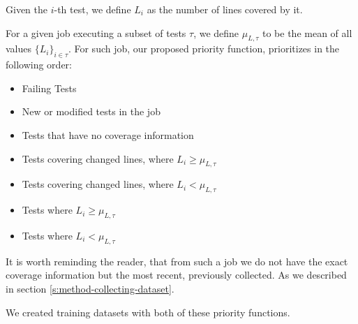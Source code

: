 Given the $i$-th test, we define $L_i$ as the number of lines covered by it.

For a given job executing a subset of tests $\tau$, we define $\mu_{L,\tau}$ to be the mean of
all values $\{L_i\}_{i \in \tau}$. For such job, our proposed priority function, prioritizes
in the following order:

\begin{itemize}
    \item Failing Tests
    \item New or modified tests in the job
    \item Tests that have no coverage information
    \item Tests covering changed lines, where $L_i \ge \mu_{L,\tau}$
    \item Tests covering changed lines, where $L_i < \mu_{L,\tau}$
    \item Tests where $L_i \ge \mu_{L,\tau}$
    \item Tests where $L_i < \mu_{L,\tau}$
\end{itemize}

It is worth reminding the reader, that from such a job we do not have the exact coverage information
but the most recent, previously collected. As we described in section \ref{s:method-collecting-dataset}.

We created training datasets with both of these priority functions.
